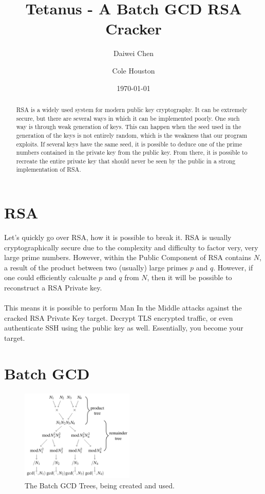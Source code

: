 \documentclass[10pt, letterpaper]{article}
\title{Tetanus - A Batch GCD RSA Cracker}
\author{Daiwei Chen \and Cole Houston}
\date{\today}
\begin{document}
\maketitle

\begin{abstract}
RSA is a widely used system for modern public key cryptography. It can be extremely secure, but there are several ways in which it can be implemented poorly. One such way is through weak generation of keys. This can happen when the seed used in the generation of the keys is not entirely random, which is the weakness that our program exploits. If several keys have the same seed, it is possible to deduce one of the prime numbers contained in the private key from the public key.  From there, it is possible to recreate the entire private key that should never be seen by the public in a strong implementation of RSA.
\end{abstract}

\section{RSA}
Let's quickly go over RSA, how it is possible to break it. RSA is usually cryptographically secure due to the complexity and difficulty to factor very, very large prime numbers. However, within the Public Component of RSA contains $N$, a result of the product between two (usually) large primes $p$ and $q$. However, if one could efficiently calcualte $p$ and $q$ from $N$, then it will be possible to reconstruct a RSA Private key. \\
\\
This means it is possible to perform Man In the Middle attacks against the cracked RSA Private Key target. Decrypt TLS encrypted traffic, or even authenticate SSH using the public key as well. Essentially, you become your target.

\section{Batch GCD}

\begin{figure}
  \begin{center}
    \includegraphics[width=0.48\textwidth]{batch-gcd-tree.png}
  \end{center}
  \caption{The Batch GCD Trees, being created and used.}
\end{figure}
\end{document}
